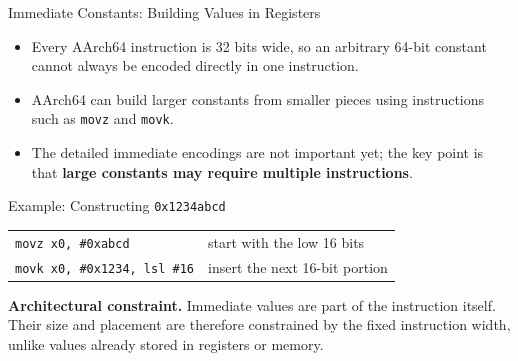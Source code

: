 \documentclass[aspectratio=169,11pt,t,xcolor=table]{beamer}
\newcommand{\key}[1]{\textbf{#1}}
\newcommand{\hex}[1]{\texttt{0x#1}}
\newcommand{\code}[1]{\texttt{#1}}
\begin{document}
\begin{frame}{Immediate Constants: Building Values in Registers}
\vfill
\begin{itemize}\setlength{\itemsep}{5pt}
  \item Every AArch64 instruction is 32 bits wide, so an arbitrary 64-bit constant cannot always be encoded directly in one instruction.
  \item AArch64 can build larger constants from smaller pieces using instructions such as \code{movz} and \code{movk}.
  \item The detailed immediate encodings are not important yet; the key point is that \key{large constants may require multiple instructions}.
\end{itemize}

\vfill
\begin{block}{Example: Constructing \hex{1234abcd}}
\small
\begin{tabular}{ll}
\rowcolor{tablerow}
\code{movz x0, \#0xabcd} & start with the low 16 bits \\
\code{movk x0, \#0x1234, lsl \#16} & insert the next 16-bit portion \\
\end{tabular}
\end{block}

\vfill
\small
\textbf{Architectural constraint.} Immediate values are part of the instruction itself. Their size and placement are therefore constrained by the fixed instruction width, unlike values already stored in registers or memory.
\vfill
\end{frame}


\end{document}
